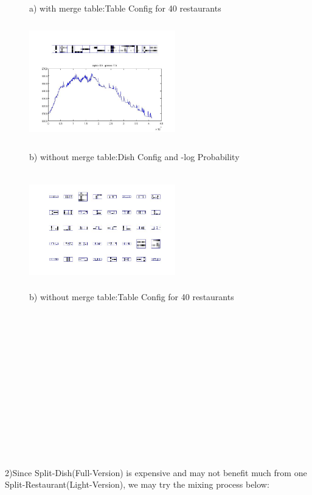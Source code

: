 \documentclass{article}
\begin{document}
\begin{spacing}{1.1}
\begin{figure}[h]
\begin{minipage}[b]{0.5\textwidth}
    \caption{a) with merge table:Table Config for 40 restaurants}
    \label{fig:by:table}  
   \end{minipage}%
\end{figure}
\begin{figure}[h] 
  \begin{minipage}[b]{0.5\textwidth} 
    \centering 
    \includegraphics[width=2.5in,height=2in]{init1_5_nmt40.jpg} 
    \caption{b) without merge table:Dish Config and -log Probability}
    \label{fig:by:table} 
  \end{minipage}%
  \begin{minipage}[b]{0.5\textwidth} 
    \centering 
    \includegraphics[width=2.5in,height=2in]{init1_5_nmt40d.jpg} 
    \caption{b) without merge table:Table Config for 40 restaurants}
    \label{fig:by:table}  
   \end{minipage}%
\end{figure}
\\ \\ \\ \\ \\ \\ \\ \\ \\ \\ \\ \\ \\ 
2)Since Split-Dish(Full-Version) is expensive and may not benefit much from one Split-Restaurant(Light-Version), we may try the mixing process below:

\end{spacing}
\end{document}
